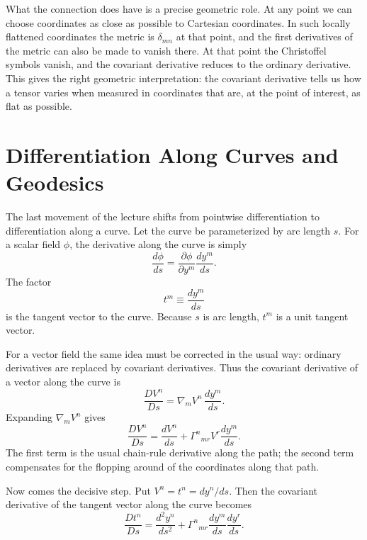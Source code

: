 What the connection does have is a precise geometric role. At any point we can choose coordinates as close as possible to Cartesian coordinates. In such locally flattened coordinates the metric is \(\delta_{mn}\) at that point, and the first derivatives of the metric can also be made to vanish there. At that point the Christoffel symbols vanish, and the covariant derivative reduces to the ordinary derivative. This gives the right geometric interpretation: the covariant derivative tells us how a tensor varies when measured in coordinates that are, at the point of interest, as flat as possible.

\section{Differentiation Along Curves and Geodesics}

The last movement of the lecture shifts from pointwise differentiation to differentiation along a curve. Let the curve be parameterized by arc length \(s\). For a scalar field \(\phi\), the derivative along the curve is simply
\begin{equation}
\frac{d\phi}{ds}
=
\frac{\partial \phi}{\partial y^m}\frac{dy^m}{ds}.
\end{equation}
The factor
\begin{equation}
t^m\equiv \frac{dy^m}{ds}
\end{equation}
is the tangent vector to the curve. Because \(s\) is arc length, \(t^m\) is a unit tangent vector.

For a vector field the same idea must be corrected in the usual way: ordinary derivatives are replaced by covariant derivatives. Thus the covariant derivative of a vector along the curve is
\begin{equation}
\frac{D V^n}{Ds}
=
\nabla_m V^n\,\frac{dy^m}{ds}.
\end{equation}
Expanding \(\nabla_m V^n\) gives
\begin{equation}
\frac{D V^n}{Ds}
=
\frac{dV^n}{ds}
+
\Gamma^n{}_{mr}V^r\frac{dy^m}{ds}.
\end{equation}
The first term is the usual chain-rule derivative along the path; the second term compensates for the flopping around of the coordinates along that path.

Now comes the decisive step. Put \(V^n=t^n=dy^n/ds\). Then the covariant derivative of the tangent vector along the curve becomes
\begin{equation}
\frac{D t^n}{Ds}
=
\frac{d^2 y^n}{ds^2}
+
\Gamma^n{}_{mr}\frac{dy^m}{ds}\frac{dy^r}{ds}.
\end{equation}

